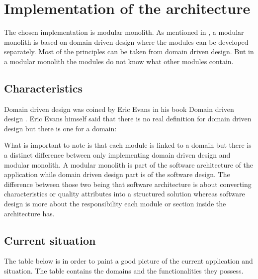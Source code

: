 \chapter{Implementation of the architecture}

The chosen implementation is modular monolith. As mentioned in , a modular monolith is based on domain driven design where the modules can be developed separately. Most of the principles can be taken from domain driven design. But in a modular monolith the modules do not know what other modules contain.

\section{Characteristics}

Domain driven design was coined by Eric Evans in his book Domain driven design \cite{domainDrivenDesign}. Eric Evans himself said that there is no real definition for domain driven design but there is one for a domain:


What is important to note is that each module is linked to a domain but there is a distinct difference between only implementing domain driven design and modular monolith. A modular monolith is part of the software architecture of the application while domain driven design part is of the software design. The difference between those two being that software architecture is about converting characteristics or quality attributes into a structured solution whereas software design is more about the responsibility each module or section inside the architecture has. \cite{softwareArchitectureDefinition}

\section{Current situation}

The table below is in order to paint a good picture of the current application and situation. The table contains the domains and the functionalities they possess.

